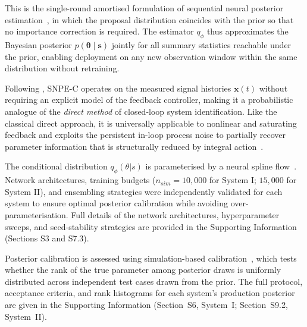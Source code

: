 \documentclass[aps,pre,twocolumn,superscriptaddress]{revtex4-2}
\begin{document}
This is the single-round amortised formulation of sequential neural posterior estimation~\citep[SNPE-C;][]{Greenberg2019}, in which the proposal distribution coincides with the prior so that no importance correction is required.  The estimator $q_\phi$ thus approximates the Bayesian posterior $p(\boldsymbol{\theta}\mid\mathbf{s})$ jointly for all summary statistics reachable under the prior, enabling deployment on any new observation window within the same distribution without retraining.

Following \citet{Forssell1999}, SNPE-C operates on the measured signal histories $\mathbf{x}(t)$ without requiring an explicit model of the feedback controller, making it a probabilistic analogue of the \emph{direct method} of closed-loop system identification. Like the classical direct approach, it is universally applicable to nonlinear and
saturating feedback and exploits the persistent in-loop process noise to partially recover parameter information that is structurally reduced by integral action~\citep{Ljung1999}.

The conditional distribution $q_\phi(\theta\vert{}s)$ is parameterised by a neural spline flow~\citep{Durkan2019}. Network architectures, training budgets ($n_{sim} = 10,000$ for System I; $15,000$ for System II), and ensembling strategies were independently validated for each system to ensure optimal posterior calibration while avoiding over-parameterisation.  Full details of the network architectures, hyperparameter sweeps, and seed-stability strategies are provided in the Supporting Information (Sections S3 and S7.3).

Posterior calibration is assessed using simulation-based calibration~\citep{Talts2018}, which tests whether the rank of the true parameter among posterior draws is uniformly
distributed across independent test cases drawn from the prior. The full protocol, acceptance criteria, and rank histograms for each system's production posterior are
given in the Supporting Information (Section~S6, System~I; Section~S9.2, System~II).
\end{document}
